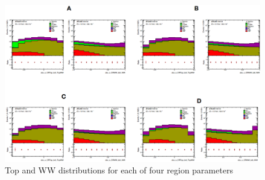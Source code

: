 \begin{figure}[!htbp]
\centering
\includegraphics[width=.9\linewidth]{Pictures/ZttBDT/TopWWCR.png}
\caption{Top and WW distributions for each of four region parameters}
\label{fig:ZjetsBDTTopWWCR}
\end{figure} 





